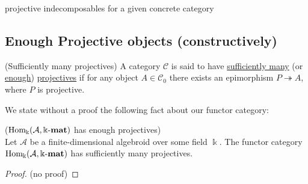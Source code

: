 projective indecomposables for a given concrete category


\subsection{Enough Projective objects (constructively)}

\begin{definition}{(Sufficiently many projectives)}\label{def:enough_projectives}
A category $\mathcal{C}$ is said to have \ul{sufficiently many} (or \ul{enough}) \ul{projectives} if for any object $A \in \mathcal{C}_{0}$
there exists an epimorphism $P \twoheadrightarrow A$, where $P$ is projective.
\end{definition}

We state without a proof the following fact about our functor category:

\begin{theorem}{($\mathrm{Hom_{\Bbbk}}(\mathcal{A},\Bbbk\textnormal{-}\mathbf{mat})$ has enough projectives)}\\
Let $\mathcal{A}$ be a finite-dimensional algebroid over some field $\Bbbk$. The functor category $\mathrm{Hom_{\Bbbk}}(\mathcal{A},\Bbbk\textnormal{-}\mathbf{mat})$ has sufficiently many
projectives.
\end{theorem}
\begin{proof}
(no proof)
\end{proof}
